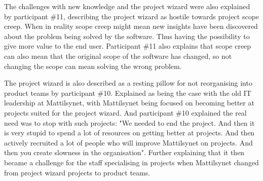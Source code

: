 
The challenges with new knowledge and the project wizard were also explained by participant \#11, describing the project wizard as hostile towards project scope creep. When in reality scope creep might mean new insights have been discovered about the problem being solved by the software. Thus having the possibility to give more value to the end user. Participant \#11 also explains that scope creep can also mean that the original scope of the software has changed, so not changing the scope can mean solving the wrong problem.


The project wizard is also described as a resting pillow for not reorganising into product teams by participant \#10. Explained as being the case with the old IT leadership at Mattilsynet, with Mattilsynet being focused on becoming better at projects suited for the project wizard. And participant \#10 explained the real need was to stop with such projects: "We needed to end the project. And then it is very stupid to spend a lot of resources on getting better at projects. And then actively recruited a lot of people who will improve Mattilsynet on projects. And then you create slowness in the organisation". Further explaining that it then became a challenge for the staff specialising in projects when Mattilsynet changed from project wizard projects to product teams.

